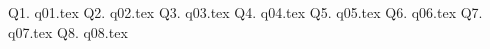 

\newcommand\myincludetex[1]{\textbox{{\scriptsize \texttt{#1}}}

    
}

\newcommand\myincludesrc[1]{\textbox{{\scriptsize \texttt{#1}}}
    
    \VerbatimInput[fontsize=\footnotesize,frame=single]{#1}
}


\newpage Q1. {q01.tex}
\newpage Q2. {q02.tex}
\newpage Q3. {q03.tex}
\newpage Q4. {q04.tex}
\newpage Q5. {q05.tex}
\newpage Q6. {q06.tex}
\newpage Q7. {q07.tex}
\newpage Q8. {q08.tex}
\newpage 

    